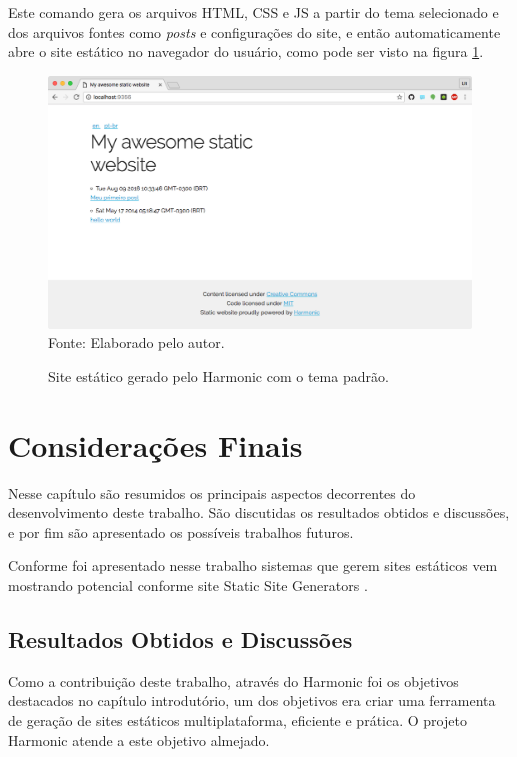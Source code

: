 \documentclass[ppginf, pep]{esinucpel}
\begin{document}
Este comando gera os arquivos HTML, CSS e JS a partir do tema selecionado e dos arquivos fontes como \textit{posts} e configurações do site, e então automaticamente abre o site estático no navegador do usuário, como pode ser visto na figura \ref{fig:harmonic_site_default}.

\begin{figure}[H]
    \centering
    \caption{Site estático gerado pelo Harmonic com o tema padrão.}
    \vspace{5pt}
    \includegraphics[width=\textwidth]{harmonic_site_default}
    Fonte: Elaborado pelo autor.
    \label{fig:harmonic_site_default}
\end{figure}

\chapter{Considerações Finais}

Nesse capítulo são resumidos os principais aspectos decorrentes do desenvolvimento deste trabalho. São discutidas os resultados obtidos e discussões, e por fim são apresentado os possíveis trabalhos futuros.

Conforme foi apresentado nesse trabalho  sistemas que gerem sites estáticos vem mostrando potencial conforme site Static Site Generators \cite{staticsitegenerators}.



\section{Resultados Obtidos e Discussões}

Como a contribuição deste trabalho, através do Harmonic foi os objetivos destacados no capítulo introdutório, um dos objetivos era criar uma ferramenta de geração de sites estáticos multiplataforma, eficiente e prática. O projeto Harmonic atende a este objetivo almejado.
\end{document}
